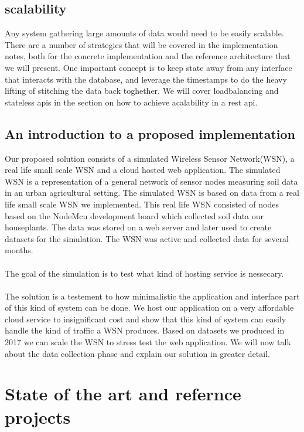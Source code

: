 \documentclass[]{uiophd}
\begin{document}
\section{scalability}
Any system gathering large amounts of data would need to be easily scalable. There are a number of strategies that will be covered in the implementation notes, both for the concrete implementation and the reference architecture that we will present. One important concept is to keep state away from any interface that interacts with the database, and leverage the timestamps to do the heavy lifting of stitching the data back toghether. We will cover loadbalancing and stateless apis in the section on how to achieve acalability in a rest api.

\section{An introduction to a proposed implementation}
Our proposed solution consists of a simulated Wireless Sensor Network(WSN), a real life small scale WSN and a cloud hosted web application. The simulated WSN is a representation of a general network of sensor nodes measuring soil data in an urban agricultural setting. The simulated WSN is based on data from a real life small scale WSN we implemented. This real life WSN consisted of nodes based on the NodeMcu development board which collected soil data our houseplants. The data was stored on a web server and later used to create datasets for the simulation. The WSN was active and collected data for several months. 
\\\\
The goal of the simulation is to test what kind of hosting service is nessecary.
\\\\
The solution is a testement to how minimalistic the application and interface part of this kind of system can be done. We host our application on a very affordable cloud service to insignificant cost and show that this kind of system can easily handle the kind of traffic a WSN produces. Based on datasets we produced in 2017 we can scale the WSN to stress test the web application. We will now talk about the data collection phase and explain our solution in greater detail.

\chapter{State of the art and refernce projects}
\end{document}
